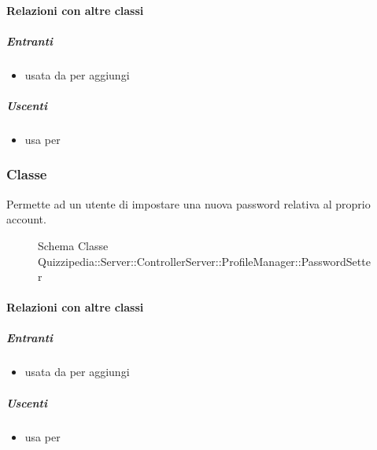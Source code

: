 \paragraph{Relazioni con altre classi}
\subparagraph{Entranti}
\begin{itemize}
\item usata da  per aggiungi
\end{itemize}
\subparagraph{Uscenti}
\begin{itemize}
\item usa  per 
\end{itemize}
\subsubsection{Classe }
Permette ad un utente di impostare una nuova password relativa al proprio account.
\begin{figure}[H]
\centering
\noindent{}
\caption[Schema Classe PasswordSetter]{Schema Classe Quizzipedia::Server::ControllerServer::ProfileManager::PasswordSetter}
\end{figure}
\paragraph{Relazioni con altre classi}
\subparagraph{Entranti}
\begin{itemize}
\item usata da  per aggiungi
\end{itemize}
\subparagraph{Uscenti}
\begin{itemize}
\item usa  per 
\end{itemize}
